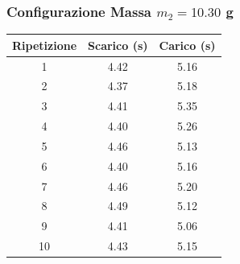 \documentclass[a4paper,12pt]{article}
\begin{document}
\subsubsection*{Configurazione Massa $m_2 = 10.30$ g}
\noindent
\begin{minipage}[c]{0.45\textwidth}
\centering
\small
\begin{tabular}{ccc}
\hline
\textbf{Ripetizione} & \textbf{Scarico (s)} & \textbf{Carico (s)} \\ \hline
1  & 4.42 & 5.16 \\
2  & 4.37 & 5.18 \\
3  & 4.41 & 5.35 \\
4  & 4.40 & 5.26 \\
5  & 4.46 & 5.13 \\
6  & 4.40 & 5.16 \\
7  & 4.46 & 5.20 \\
8  & 4.49 & 5.12 \\
9  & 4.41 & 5.06 \\
10 & 4.43 & 5.15 \\ \hline
\end{tabular}
\label{tab:dinamica_massa2}
\end{minipage}
\hfill
\begin{minipage}[c]{0.50\textwidth}
\centering
{}
\label{fig:isto_massa2}
\end{minipage}

\vspace{0.8cm}

\end{document}
